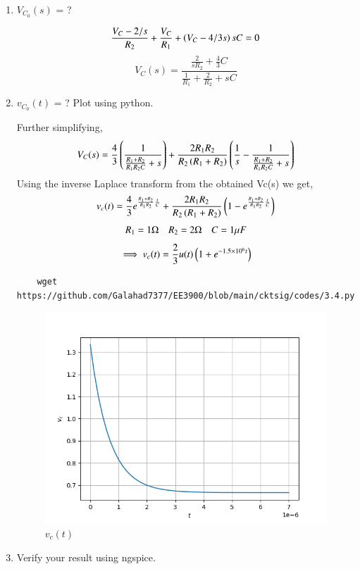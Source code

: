 \documentclass[journal,12pt,twocolumn]{IEEEtran}
\renewcommand\thesection{\arabic{section}}
\begin{document}
\begin{enumerate}[label=\arabic*.,ref=\thesection.\theenumi]
\\
		\label{prob:init}
	
		\item $V_{C_0}(s)$ = ?  
  
  \solution
  \[\frac{V_C - 2/s}{R_2} + \frac{V_C}{R_1} + \left(V_C - 4/3s\right)sC = 0\]
  \[V_C(s) = \frac{\frac{2}{sR_2} + \frac{4}{3}C}{\frac{1}{R_1} + \frac{2}{R_2} + sC}\]
	\item $v_{C_0}(t)$ = ? Plot using python.
 
 \solution Further simplifying,
 \[V_C(s) = \frac{4}{3}\left(\frac{1}{\frac{R_1 + R_2}{R_1R_2C}+s}\right) + \frac{2R_1R_2}{R_2\left(R_1+R_2\right)}\left(\frac{1}{s} - \frac{1}{ \frac{R_1 + R_2}{R_1R_2C}+ s}\right)\]
 Using the inverse Laplace transform from the obtained Vc(s) we get,
 \[v_c(t) = \frac{4}{3}e^{{\frac{R_1 + R_2}{R_1R_2}\frac{t}{C}}} + \frac{2R_1R_2}{R_2\left(R_1+R_2\right)}\left(1 - e^{{ \frac{R_1 + R_2}{R_1R_2}\frac{t}{C}}}\right)\]
 \[R_1 = 1\ohm \quad R_2 = 2\ohm \quad C = 1\mu F\]
\[\implies v_c(t) = \frac{2}{3}u(t)\left(1+e^{-1.5\times10^{6}t}\right)\]
\begin{lstlisting}
    wget https://github.com/Galahad7377/EE3900/blob/main/cktsig/codes/3.4.py
\end{lstlisting}
 \begin{figure}[!ht]
			\centering
			\includegraphics[width=\columnwidth]{figs/3.4.png}
			\caption{$v_c(t)$}
			\label{}
\end{figure}
	\item Verify your result using ngspice.


\end{enumerate}
\end{document}
